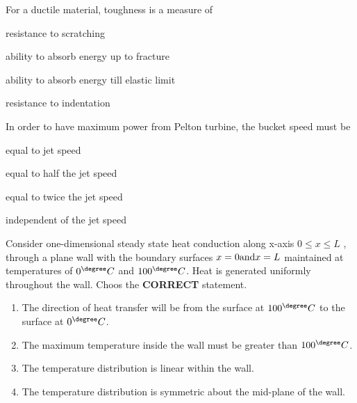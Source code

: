     \item[17.] For a ductile material, toughness is a measure of
        \hfill{}
        \begin{enumerate}
                \begin{multicols}{2}
                \item resistance to scratching \columnbreak
                \item ability to absorb energy up to fracture
                \end{multicols}
                \begin{multicols}{2}
                \item ability to absorb energy till elastic limit \columnbreak
                \item resistance to indentation
                \end{multicols}
        \end{enumerate}

        \item[18.] In order to have maximum power from Pelton turbine, the bucket speed must be
        \hfill{}
        \begin{enumerate}
                \begin{multicols}{2}
                \item equal to jet speed \columnbreak
                \item equal to half the jet speed
                \end{multicols}
                \begin{multicols}{2}
                \item equal to twice the jet speed \columnbreak
                \item independent of the jet speed
                \end{multicols}
        \end{enumerate}


    \item[19.]  Consider one-dimensional steady state heat conduction along x-axis $0 \le x \le L$
        , through a plane wall with the boundary surfaces $x = 0 \textnormal{and} x = L$ maintained
        at temperatures of $0^{\degree}C$ and $100^{\degree}C$. Heat is generated uniformly throughout
        the wall. Choos the \textbf{CORRECT} statement.

        \hfill{}
        \begin{enumerate}
            \item The direction of heat transfer will be from the surface at $100^{\degree}C$ to the surface at $0^{\degree}C$.
            \item The maximum temperature inside the wall must be greater than $100^{\degree}C$.
            \item The temperature distribution is linear within the wall.
            \item The temperature distribution is symmetric about the mid-plane of the wall.
        \end{enumerate}


